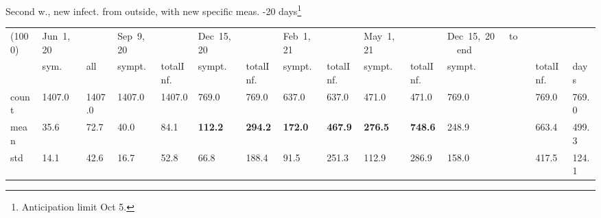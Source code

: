 \documentclass[8pt]{beamer}
\begin{document}
\begin{frame}{Second w., new infect. from outside, with new specific meas. -20 days\footnote{Anticipation limit Oct 5.}}
\begin{table}[H]
\center
\tiny
\begin{tabular}{p{0.3cm}p{0.3cm}p{0.3cm}p{0.3cm}p{0.3cm}p{0.3cm}p{0.3cm}p{0.3cm}p{0.3cm}p{0.3cm}p{0.3cm}p{0.3cm}p{0.3cm}p{0.4cm}}
\toprule
(1000) &  Jun~1,~20 & &  Sep~9,~20 & & Dec~15,~20 & & Feb~1,~21 & & May~1,~21 & & Dec~15,~20~~~to~~~end   \\
{} &  sym. &  all &  sympt. &  totalInf. &  sympt. &  totalInf. &  sympt. &  totalInf. &  sympt. &  totalInf. &  sympt. &  totalInf.  & days\\
\midrule
count &   1407.0 &                     1407.0 &   1407.0 &                     1407.0 &    769.0 &                      769.0 &    637.0 &                      637.0 &    471.0 &                      471.0 &              769.0 &                   769.0 &  769.0 \\
mean  &     35.6 &                       72.7 &     40.0 &                       84.1 &    \textbf{{\color{red}112.2}} &                     \textbf{{\color{red} 294.2}} &    \textbf{172.0} &                      \textbf{467.9} &    \textbf{276.5} &                      \textbf{748.6} &              248.9 &                   663.4 &  499.3 \\
std   &     14.1 &                       42.6 &     16.7 &                       52.8 &     66.8 &                      188.4 &     91.5 &                      251.3 &    112.9 &                      286.9 &               158.0 &                   417.5 &  124.1 \\
\bottomrule
\end{tabular}

\label{selForceWave2Contr2M-20Tab}
\end{table}


\end{frame}
\end{document}
